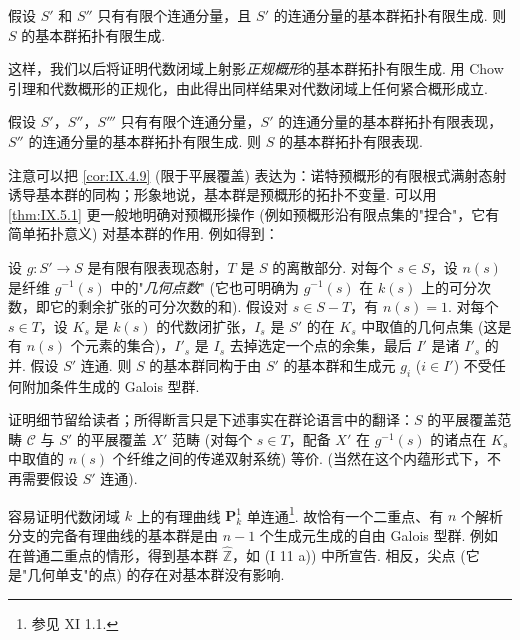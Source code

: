 \begin{corollary}\label{cor:IX.5.2}
假设 $S'$ 和 $S''$ 只有有限个连通分量，且 $S'$ 的连通分量的基本群拓扑有限生成. 则 $S$ 的基本群拓扑有限生成.
\end{corollary}

这样，我们以后将证明代数闭域上射影\emph{正规概形}的基本群拓扑有限生成. 用 Chow 引理和代数概形的正规化，由此得出同样结果对代数闭域上任何紧合概形成立.

\begin{corollary}\label{cor:IX.5.3}
假设 $S'$，$S''$，$S'''$ 只有有限个连通分量，$S'$ 的连通分量的基本群拓扑有限表现，$S''$ 的连通分量的基本群拓扑有限生成. 则 $S$ 的基本群拓扑有限表现.
\end{corollary}

注意可以把 \ref{cor:IX.4.9} (限于平展覆盖) 表达为：诺特预概形的有限根式满射态射诱导基本群的同构；形象地说，基本群是预概形的拓扑不变量. 可以用 \ref{thm:IX.5.1} 更一般地明确对预概形操作 (例如预概形沿有限点集的"捏合"，它有简单拓扑意义) 对基本群的作用. 例如得到：

\begin{corollary}\label{cor:IX.5.4}
设 $g \colon S' \to S$ 是有限有限表现态射，$T$ 是 $S$ 的离散部分. 对每个 $s \in S$，设 $n(s)$ 是纤维 $g^{-1}(s)$ 中的"\emph{几何点数}" (它也可明确为 $g^{-1}(s)$ 在 $k(s)$ 上的可分次数，即它的剩余扩张的可分次数的和). 假设对 $s \in S - T$，有 $n(s) = 1$. 对每个 $s \in T$，设 $K_s$ 是 $k(s)$ 的代数闭扩张，$I_s$ 是 $S'$ 的在 $K_s$ 中取值的几何点集 (这是有 $n(s)$ 个元素的集合)，$I'_s$ 是 $I_s$ 去掉选定一个点的余集，最后 $I'$ 是诸 $I'_s$ 的并. 假设 $S'$ 连通. 则 $S$ 的基本群同构于由 $S'$ 的基本群和生成元 $g_i$ ($i \in I'$) 不受任何附加条件生成的 Galois 型群.
\end{corollary}

证明细节留给读者；所得断言只是下述事实在群论语言中的翻译：$S$ 的平展覆盖范畴 $\mathcal{C}$ 与 $S'$ 的平展覆盖 $X'$ 范畴 (对每个 $s \in T$，配备 $X'$ 在 $g^{-1}(s)$ 的诸点在 $K_s$ 中取值的 $n(s)$ 个纤维之间的传递双射系统) 等价. (当然在这个内蕴形式下，不再需要假设 $S'$ 连通).

\begin{example}\label{exa:IX.5.5}
容易证明代数闭域 $k$ 上的有理曲线 $\mathbf{P}^1_k$ 单连通\footnote{参见 XI 1.1.}. 故恰有一个二重点、有 $n$ 个解析分支的完备有理曲线的基本群是由 $n - 1$ 个生成元生成的自由 Galois 型群. 例如在普通二重点的情形，得到基本群 $\widehat{\mathbb{Z}}$，如 (I 11 a)) 中所宣告. 相反，尖点 (它是"几何单支"的点) 的存在对基本群没有影响.
\end{example}

